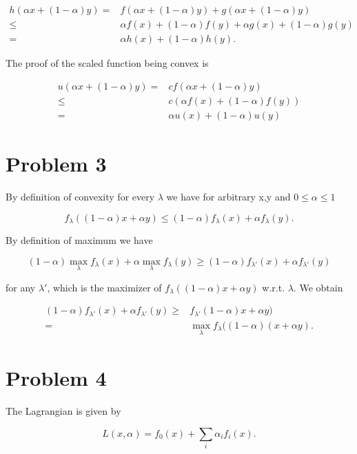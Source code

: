 \documentclass[12pt]{article}
\begin{document}
\begin{align}
h(\alpha x + (1-\alpha)y) =& f(\alpha x + (1-\alpha)y) + g(\alpha x + (1-\alpha)y)\\
\leq& \alpha f(x) +(1-\alpha)f(y) +\alpha g(x) +(1-\alpha)g(y)\\
=& \alpha h(x) +(1-\alpha)h(y).
\end{align}

The proof of the scaled function being convex is

\begin{align}
u(\alpha x + (1-\alpha)y) =& cf(\alpha x + (1-\alpha)y)\\
\leq& c\left(\alpha f(x) +(1-\alpha)f(y)\right)\\
=& \alpha u(x) +(1-\alpha)u(y)
\end{align}

\section*{Problem 3}

By definition of convexity for every $\lambda$ we have for arbitrary x,y and $0\leq\alpha\leq1$

\begin{equation}
f_\lambda((1-\alpha)x + \alpha y) \leq (1-\alpha)f_\lambda(x) + \alpha f_\lambda(y).
\end{equation}

By definition of maximum we have

\begin{equation}
(1-\alpha)\max\limits_{\lambda}f_\lambda(x) + \alpha \max\limits_{\lambda}f_\lambda(y) \geq (1-\alpha)f_{\lambda '}(x) + \alpha f_{\lambda '}(y)
\end{equation}

for any $\lambda '$, which is the maximizer of $f_\lambda((1-\alpha)x + \alpha y)$ w.r.t. $\lambda$. We obtain

\begin{align}
(1-\alpha)f_{\lambda '}(x) + \alpha f_{\lambda '}(y) \geq& f_{\lambda '}(1-\alpha)x + \alpha y)\\
=& \max\limits_{\lambda}f_\lambda((1-\alpha)(x + \alpha y).
\end{align}

\section*{Problem 4}
The Lagrangian is given by

\begin{equation}
L(x,\alpha) = f_0(x) + \sum_{i}{\alpha_i f_i(x)}.
\end{equation}
\end{document}
